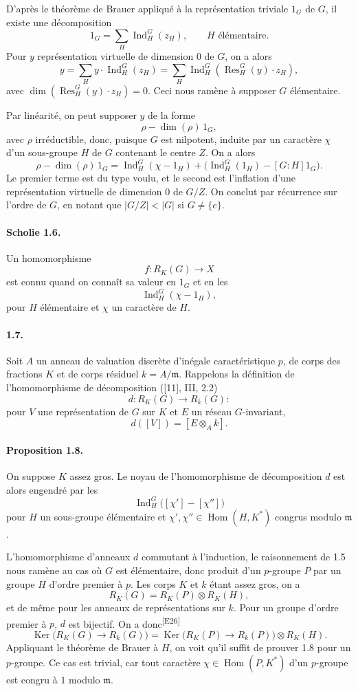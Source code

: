 \documentclass[10pt,letterpaper]{article}
\newcommand{\Hom}{\operatorname{Hom}}
\newcommand{\Ind}{\operatorname{Ind}}
\newcommand{\Res}{\operatorname{Res}}
\providecommand{\Hom}{\operatorname{Hom}}
\providecommand{\Hom}{\operatorname{Hom}}
\providecommand{\Hom}{\operatorname{Hom}}
\providecommand{\Ind}{\operatorname{Ind}}
\newcommand{\auditmark}[1]{\textsuperscript{\normalfont\scriptsize[E#1]}}
\begin{document}
D'après le théorème de Brauer appliqué à la représentation triviale \(1_G\) de \(G\), il existe une décomposition
\[
1_G=\sum_H \Ind_H^G(z_H),
\qquad H\text{ élémentaire}.
\]
Pour \(y\) représentation virtuelle de dimension \(0\) de \(G\), on a alors
\[
y=\sum_H y\cdot \Ind_H^G(z_H)
  =\sum_H\Ind_H^G(\Res_H^G(y)\cdot z_H),
\]
avec \(\dim(\Res_H^G(y)\cdot z_H)=0\). Ceci nous ramène à supposer \(G\) élémentaire.

Par linéarité, on peut supposer \(y\) de la forme
\[
\rho-\dim(\rho)\,1_G,
\]
avec \(\rho\) irréductible, donc, puisque \(G\) est nilpotent, induite par un caractère \(\chi\) d'un sous-groupe \(H\) de \(G\) contenant le centre \(Z\). On a alors
\[
\rho-\dim(\rho)\,1_G
=
\Ind_H^G(\chi-1_H)+\bigl(\Ind_H^G(1_H)-[G:H]1_G\bigr).
\]
Le premier terme est du type voulu, et le second est l'inflation d'une représentation virtuelle de dimension \(0\) de \(G/Z\). On conclut par récurrence sur l'ordre de \(G\), en notant que \(|G/Z|<|G|\) si \(G\ne\{e\}\).

\paragraph{Scholie 1.6.} Un homomorphisme
\[
f:R_K(G)\longrightarrow X
\]
est connu quand on connaît sa valeur en \(1_G\) et en les
\[
\Ind_H^G(\chi-1_H),
\]
pour \(H\) élémentaire et \(\chi\) un caractère de \(H\).

\paragraph{1.7.} Soit \(A\) un anneau de valuation discrète d'inégale caractéristique \(p\), de corps des fractions \(K\) et de corps résiduel \(k=A/\mathfrak m\). Rappelons la définition de l'homomorphisme de décomposition ([11], III, 2.2)
\[
d:R_K(G)\longrightarrow R_k(G):
\]
pour \(V\) une représentation de \(G\) sur \(K\) et \(E\) un réseau \(G\)-invariant,
\[
d([V])=[E\otimes_Ak].
\]




\paragraph{Proposition 1.8.} On suppose \(K\) assez gros. Le noyau de l'homomorphisme de décomposition \(d\) est alors engendré par les
\[
\Ind_H^G\bigl([\chi']-[\chi'']\bigr)
\]
pour \(H\) un sous-groupe élémentaire et \(\chi',\chi''\in\Hom(H,K^*)\) congrus modulo \(\mathfrak m\).

L'homomorphisme d'anneaux \(d\) commutant à l'induction, le raisonnement de 1.5 nous ramène au cas où \(G\) est élémentaire, donc produit d'un \(p\)-groupe \(P\) par un groupe \(H\) d'ordre premier à \(p\). Les corps \(K\) et \(k\) étant assez gros, on a
\[
R_K(G)=R_K(P)\otimes R_K(H),
\]
et de même pour les anneaux de représentations sur \(k\). Pour un groupe d'ordre premier à \(p\), \(d\) est bijectif. On a donc\auditmark{26}
\[
\operatorname{Ker}\bigl(R_K(G)\to R_k(G)\bigr)
=\operatorname{Ker}\bigl(R_K(P)\to R_k(P)\bigr)\otimes R_K(H).
\]
Appliquant le théorème de Brauer à \(H\), on voit qu'il suffit de prouver 1.8 pour un \(p\)-groupe. Ce cas est trivial, car tout caractère \(\chi\in\Hom(P,K^*)\) d'un \(p\)-groupe est congru à \(1\) modulo \(\mathfrak m\).
\end{document}
